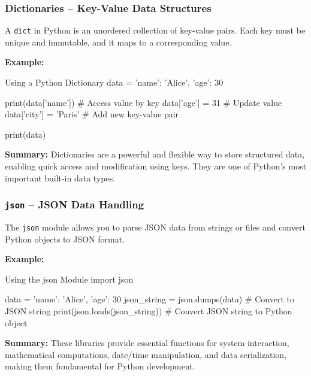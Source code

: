 %
\subsubsection{Dictionaries – Key-Value Data Structures}

A \texttt{dict} in Python is an unordered collection of key-value pairs. Each key must be unique and immutable, and it maps to a corresponding value.

\textbf{Example:}
\begin{codeonly}{Using a Python Dictionary}
data = {'name': 'Alice', 'age': 30}

print(data['name'])     # Access value by key
data['age'] = 31        # Update value
data['city'] = 'Paris'  # Add new key-value pair

print(data)
\end{codeonly}

\textbf{Summary:} Dictionaries are a powerful and flexible way to store structured data, enabling quick access and modification using keys. They are one of Python's most important built-in data types.

%
\subsubsection{\texttt{json} – JSON Data Handling}

The \texttt{json} module allows you to parse JSON data from strings or files and convert Python objects to JSON format.

\textbf{Example:}
\begin{codeonly}{Using the json Module}
import json

data = {'name': 'Alice', 'age': 30}
json_string = json.dumps(data)  # Convert to JSON string
print(json.loads(json_string))  # Convert JSON string to Python object
\end{codeonly}

\textbf{Summary:} These libraries provide essential functions for system interaction, mathematical computations, date/time manipulation, and data serialization, making them fundamental for Python development.

%
